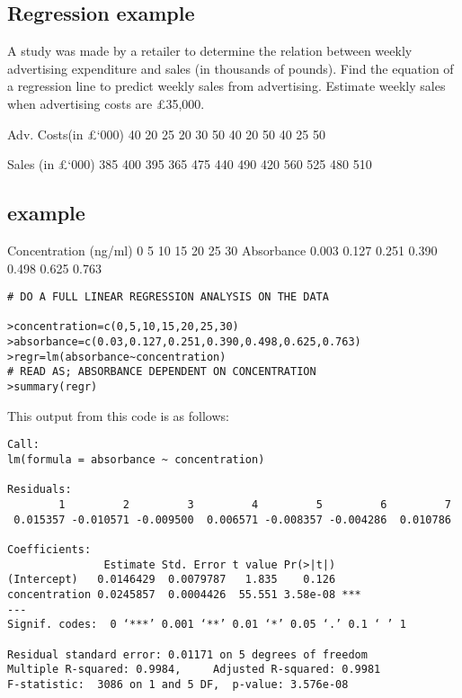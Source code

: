 ﻿\subsection{Regression example}

A study was made by a retailer to determine the relation between weekly advertising
expenditure and sales (in thousands of pounds). Find the equation of a regression line
to predict weekly sales from advertising. Estimate weekly sales when advertising
costs are £35,000.

Adv. Costs(in £‘000) 40 20 25 20 30 50 40 20 50 40 25 50

Sales (in £‘000) 385 400 395 365 475 440 490 420 560 525 480 510



\subsection{example}
Concentration (ng/ml) 0 5 10 15 20 25 30
Absorbance 0.003 0.127 0.251 0.390 0.498 0.625 0.763

\begin{verbatim}
# DO A FULL LINEAR REGRESSION ANALYSIS ON THE DATA

>concentration=c(0,5,10,15,20,25,30)
>absorbance=c(0.03,0.127,0.251,0.390,0.498,0.625,0.763)
>regr=lm(absorbance~concentration)
# READ AS; ABSORBANCE DEPENDENT ON CONCENTRATION
>summary(regr)
\end{verbatim}

This output from this code is as follows:
\begin{verbatim}
Call:
lm(formula = absorbance ~ concentration)

Residuals:
        1         2         3         4         5         6         7
 0.015357 -0.010571 -0.009500  0.006571 -0.008357 -0.004286  0.010786

Coefficients:
               Estimate Std. Error t value Pr(>|t|)
(Intercept)   0.0146429  0.0079787   1.835    0.126
concentration 0.0245857  0.0004426  55.551 3.58e-08 ***
---
Signif. codes:  0 ‘***’ 0.001 ‘**’ 0.01 ‘*’ 0.05 ‘.’ 0.1 ‘ ’ 1

Residual standard error: 0.01171 on 5 degrees of freedom
Multiple R-squared: 0.9984,     Adjusted R-squared: 0.9981
F-statistic:  3086 on 1 and 5 DF,  p-value: 3.576e-08

\end{verbatim}


